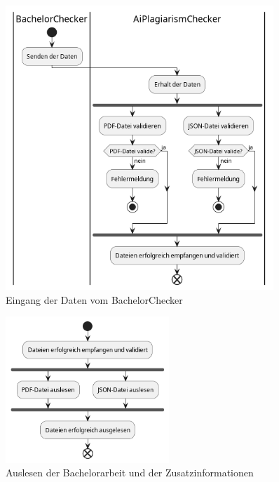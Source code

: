 \begin{figure}[H]
    \centering
    \includegraphics[width=0.9\textwidth]{images/diagrams/bpd/EingangDerDatenVomBachelorChecker/GPD-Eingang der Daten vom BachelorChecker.png}
    \caption{Eingang der Daten vom BachelorChecker}
    \label{fig:eingangDerDatenVomBachelorChecker}
\end{figure}

\begin{figure}[H]
    \centering
    \includegraphics[width=0.55\textwidth]{images/diagrams/bpd/AuslesenDerBachelorarbeit/GPD-Auslesen der Bachelorarbeit.png}
    \caption{Auslesen der Bachelorarbeit und der Zusatzinformationen}
    \label{fig:auslesenDerBachelorarbeit}
\end{figure}

